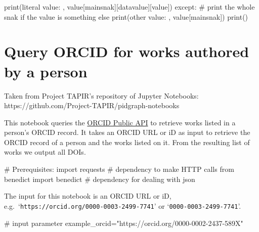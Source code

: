 \documentclass[
  letterpaper,
  DIV=11,
  numbers=noendperiod]{scrreprt}
\newenvironment{Shaded}{\begin{snugshade}}{\end{snugshade}}
\newcommand{\BuiltInTok}[1]{\textcolor[rgb]{0.00,0.23,0.31}{#1}}
\newcommand{\CommentTok}[1]{\textcolor[rgb]{0.37,0.37,0.37}{#1}}
\newcommand{\ControlFlowTok}[1]{\textcolor[rgb]{0.00,0.23,0.31}{#1}}
\newcommand{\ImportTok}[1]{\textcolor[rgb]{0.00,0.46,0.62}{#1}}
\newcommand{\NormalTok}[1]{\textcolor[rgb]{0.00,0.23,0.31}{#1}}
\newcommand{\OperatorTok}[1]{\textcolor[rgb]{0.37,0.37,0.37}{#1}}
\newcommand{\StringTok}[1]{\textcolor[rgb]{0.13,0.47,0.30}{#1}}
\begin{document}
\begin{Shaded}
\begin{Highlighting}[]
                \BuiltInTok{print}\NormalTok{(}\StringTok{\textquotesingle{}literal value: \textquotesingle{}}\NormalTok{, value[}\StringTok{\textquotesingle{}mainsnak\textquotesingle{}}\NormalTok{][}\StringTok{\textquotesingle{}datavalue\textquotesingle{}}\NormalTok{][}\StringTok{\textquotesingle{}value\textquotesingle{}}\NormalTok{])}
            \ControlFlowTok{except}\NormalTok{:}
                \CommentTok{\# print the whole snak if the value is something else}
                \BuiltInTok{print}\NormalTok{(}\StringTok{\textquotesingle{}other value: \textquotesingle{}}\NormalTok{, value[}\StringTok{\textquotesingle{}mainsnak\textquotesingle{}}\NormalTok{])}
    \BuiltInTok{print}\NormalTok{()}
\end{Highlighting}
\end{Shaded}


\hypertarget{query-orcid-for-works-authored-by-a-person}{%
\chapter{Query ORCID for works authored by a
person}\label{query-orcid-for-works-authored-by-a-person}}

Taken from Project TAPIR's repository of Jupyter Notebooks:
https://github.com/Project-TAPIR/pidgraph-notebooks

This notebook queries the \href{https://pub.orcid.org/v3.0/}{ORCID
Public API} to retrieve works listed in a person's ORCID record. It
takes an ORCID URL or iD as input to retrieve the ORCID record of a
person and the works listed on it. From the resulting list of works we
output all DOIs.

\begin{Shaded}
\begin{Highlighting}[]
\CommentTok{\# Prerequisites:}
\ImportTok{import}\NormalTok{ requests                        }\CommentTok{\# dependency to make HTTP calls}
\ImportTok{from}\NormalTok{ benedict }\ImportTok{import}\NormalTok{ benedict          }\CommentTok{\# dependency for dealing with json}
\end{Highlighting}
\end{Shaded}

The input for this notebook is an ORCID URL or iD,
e.g.~`\texttt{https://orcid.org/0000-0003-2499-7741}' or
`\texttt{0000-0003-2499-7741}'.

\begin{Shaded}
\begin{Highlighting}[]
\CommentTok{\# input parameter}
\NormalTok{example\_orcid}\OperatorTok{=}\StringTok{"https://orcid.org/0000{-}0002{-}2437{-}589X"}
\end{Highlighting}
\end{Shaded}
\end{document}
